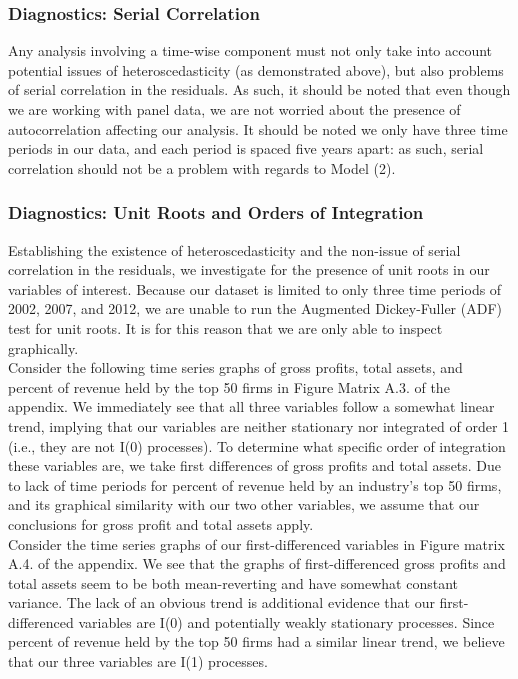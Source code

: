 \subsubsection{Diagnostics: Serial Correlation}

Any analysis involving a time-wise component must not only take into account potential issues of heteroscedasticity (as demonstrated above), but also problems of serial correlation in the residuals. As such, it should be noted that even though we are working with panel data, we are not worried about the presence of autocorrelation affecting our analysis. It should be noted we only have three time periods in our data, and each period is spaced five years apart: as such, serial correlation should not be a problem with regards to Model (2).

\subsubsection{Diagnostics: Unit Roots and Orders of Integration}

Establishing the existence of heteroscedasticity and the non-issue of serial correlation in the residuals, we investigate for the presence of unit roots in our variables of interest. Because our dataset is limited to only three time periods of 2002, 2007, and 2012, we are unable to run the Augmented Dickey-Fuller (ADF) test for unit roots. It is for this reason that we are only able to inspect graphically. \\

Consider the following time series graphs of gross profits, total assets, and percent of revenue held by the top 50 firms in Figure Matrix A.3. of the appendix. We immediately see that all three variables follow a somewhat linear trend, implying that our variables are neither stationary nor integrated of order 1 (i.e., they are not I(0) processes). To determine what specific order of integration these variables are, we take first differences of gross profits and total assets. Due to lack of time periods for percent of revenue held by an industry's top 50 firms, and its graphical similarity with our two other variables, we assume that our conclusions for gross profit and total assets apply. \\

Consider the time series graphs of our first-differenced variables in Figure matrix A.4. of the appendix. We see that the graphs of first-differenced gross profits and total assets seem to be both mean-reverting and have somewhat constant variance. The lack of an obvious trend is additional evidence that our first-differenced variables are I(0) and potentially weakly stationary processes. Since percent of revenue held by the top 50 firms had a similar linear trend, we believe that our three variables are I(1) processes.


